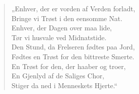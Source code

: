 \documentclass[12pt,a4paper]{book}
\begin{document}
\begingroup\small
\begin{verse}
„Enhver, der er vorden af Verden forladt,\\
Bringe vi Trøst i den eensomme Nat.\\
Enhver, der Dagen over maa lide,\\
Tør vi husvale ved Midnatstide.\\
Den Stund, da Frelseren fødtes paa Jord,\\
Fødtes en Trøst for den bittreste Smerte.\\
En Trøst for den, der haaber og troer,\\
En Gjenlyd af de Saliges Chor,\\
Stiger da ned i Menneskets Hjerte.“
\end{verse}
\endgroup
\end{document}
